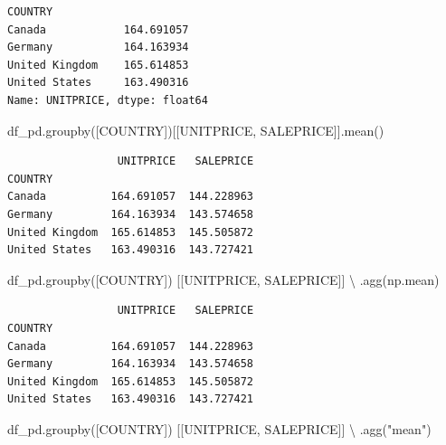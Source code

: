 \documentclass[
  letterpaper,
  DIV=11,
  numbers=noendperiod]{scrreprt}
\newenvironment{Shaded}{\begin{snugshade}}{\end{snugshade}}
\newcommand{\NormalTok}[1]{\textcolor[rgb]{0.00,0.23,0.31}{#1}}
\newcommand{\OperatorTok}[1]{\textcolor[rgb]{0.37,0.37,0.37}{#1}}
\newcommand{\StringTok}[1]{\textcolor[rgb]{0.13,0.47,0.30}{#1}}
\begin{document}
\begin{verbatim}
COUNTRY
Canada            164.691057
Germany           164.163934
United Kingdom    165.614853
United States     163.490316
Name: UNITPRICE, dtype: float64
\end{verbatim}

\begin{Shaded}
\begin{Highlighting}[]
\NormalTok{df\_pd.groupby([}\StringTok{\textquotesingle{}COUNTRY\textquotesingle{}}\NormalTok{])[[}\StringTok{\textquotesingle{}UNITPRICE\textquotesingle{}}\NormalTok{, }\StringTok{\textquotesingle{}SALEPRICE\textquotesingle{}}\NormalTok{]].mean()}
\end{Highlighting}
\end{Shaded}

\begin{verbatim}
                 UNITPRICE   SALEPRICE
COUNTRY                               
Canada          164.691057  144.228963
Germany         164.163934  143.574658
United Kingdom  165.614853  145.505872
United States   163.490316  143.727421
\end{verbatim}

\begin{Shaded}
\begin{Highlighting}[]
\NormalTok{df\_pd.groupby([}\StringTok{\textquotesingle{}COUNTRY\textquotesingle{}}\NormalTok{]) [[}\StringTok{\textquotesingle{}UNITPRICE\textquotesingle{}}\NormalTok{, }\StringTok{\textquotesingle{}SALEPRICE\textquotesingle{}}\NormalTok{]] }\OperatorTok{\textbackslash{}}
\NormalTok{    .agg(np.mean) }
\end{Highlighting}
\end{Shaded}

\begin{verbatim}
                 UNITPRICE   SALEPRICE
COUNTRY                               
Canada          164.691057  144.228963
Germany         164.163934  143.574658
United Kingdom  165.614853  145.505872
United States   163.490316  143.727421
\end{verbatim}

\begin{Shaded}
\begin{Highlighting}[]
\NormalTok{df\_pd.groupby([}\StringTok{\textquotesingle{}COUNTRY\textquotesingle{}}\NormalTok{]) [[}\StringTok{\textquotesingle{}UNITPRICE\textquotesingle{}}\NormalTok{, }\StringTok{\textquotesingle{}SALEPRICE\textquotesingle{}}\NormalTok{]] }\OperatorTok{\textbackslash{}}
\NormalTok{    .agg(}\StringTok{"mean"}\NormalTok{) }
\end{Highlighting}
\end{Shaded}
\end{document}
